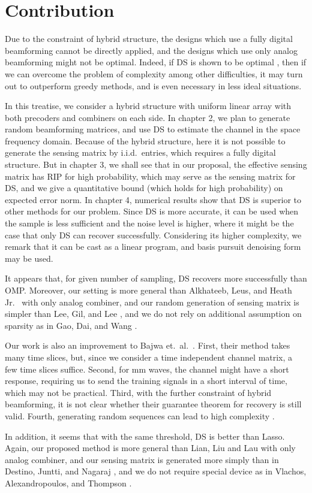 \section {Contribution}

Due to the constraint of hybrid structure, the designs which use a fully digital beamforming cannot be directly applied, and the designs which use only analog beamforming might not be optimal.
Indeed, if DS is shown to be optimal \cite {CaT07}, then if we can overcome the problem of complexity among other difficulties, it may turn out to outperform greedy methods, and is even necessary in less ideal situations.

In this treatise, we consider a hybrid structure with uniform linear array with both precoders and combiners on each side.
In chapter 2, we plan to generate random beamforming matrices, and use DS to estimate the channel in the space frequency domain.
Because of the hybrid structure, here it is not possible to generate the sensing matrix by i.i.d.\ entries, which requires a fully digital structure.
But in chapter 3, we shall see that in our proposal, the effective sensing matrix has RIP for high probability, which may serve as the sensing matrix for DS,
and we give a quantitative bound (which holds for high probability) on expected error norm.
In chapter 4, numerical results show that DS is superior to other methods for our problem.
Since DS is more accurate, it can be used when the sample is less sufficient and the noise level is higher, where it might be the case that only DS can recover successfully.
Considering its higher complexity, we remark that it can be cast as a linear program, and basis pursuit denoising form may be used.

It appears that, for given number of sampling, DS recovers more successfully than OMP.
Moreover, our setting is more general than Alkhateeb, Leus, and Heath Jr.\ \cite {ALH15} with only analog combiner,
and our random generation of sensing matrix is simpler than Lee, Gil, and Lee \cite {LGL16},
and we do not rely on additional assumption on sparsity as in Gao, Dai, and Wang \cite {GDW15}.

Our work is also an improvement to Bajwa et.\ al.\ \cite {BHS10}.
First, their method takes many time slices, but, since we consider a time independent channel matrix, a few time slices suffice.
Second, for mm waves, the channel might have a short response, requiring us to send the training signals in a short interval of time, which may not be practical.
Third, with the further constraint of hybrid beamforming, it is not clear whether their guarantee theorem for recovery is still valid.
Fourth, generating random sequences can lead to high complexity \cite {LGL16}.

In addition, it seems that with the same threshold, DS is better than Lasso.
Again, our proposed method is more general than Lian, Liu and Lau \cite {LLL17} with only analog combiner,
and our sensing matrix is generated more simply than in Destino, Juntti, and Nagaraj \cite {DJN15},
and we do not require special device as in Vlachos, Alexandropoulos, and Thompson \cite {VAT19}.

